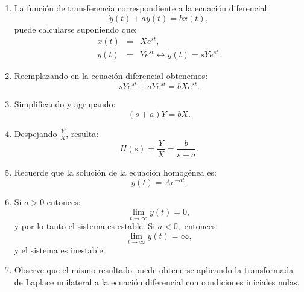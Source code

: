 \begin{enumerate}
	\item La funci\'{o}n de transferencia correspondiente a la ecuaci\'{o}n diferencial:
	\begin{equation}
		\dot{y}\left( t\right) +ay\left( t\right) =bx\left( t\right) ,
	\end{equation}
	puede calcularse suponiendo que:
	\begin{eqnarray}
		x\left( t\right) &=& X e^{st}, \\
		y\left( t\right) &=& Y e^{st} \longleftrightarrow \dot{y}\left( t\right) = s Y e^{st}.
	\end{eqnarray}
	
	\item Reemplazando en la ecuaci\'{o}n diferencial obtenemos:
	\begin{equation}
		s Y e^{st} + a Y e^{st} = b X e^{st}.
	\end{equation}
	
	\item Simplificando y agrupando:
	\begin{equation}
		\left( s+a\right) Y = b X.
	\end{equation}
	
	\item Despejando $\frac{Y}{X}$, resulta:
	\begin{equation}
		H\left( s\right) = \frac{Y}{X} = \frac{b}{s+a}.
	\end{equation}
	
	\item Recuerde que la soluci\'{o}n de la ecuaci\'{o}n homog\'{e}nea es: 
	\begin{equation}
		y\left( t\right) = A e^{-at}.
	\end{equation}
	
	\item Si $a>0$ entonces:
	\begin{equation}
		\lim_{t \to \infty} y\left( t\right) = 0,
	\end{equation}
	y por lo tanto el sistema es estable. Si $a<0,$ entonces:
	\begin{equation}
		\lim_{t \to \infty} y\left( t\right) = \infty,
	\end{equation}
	y el sistema es inestable.
	
	\item Observe que el mismo resultado puede obtenerse aplicando la transformada de Laplace unilateral a la ecuaci\'{o}n diferencial con condiciones iniciales nulas.
\end{enumerate}

